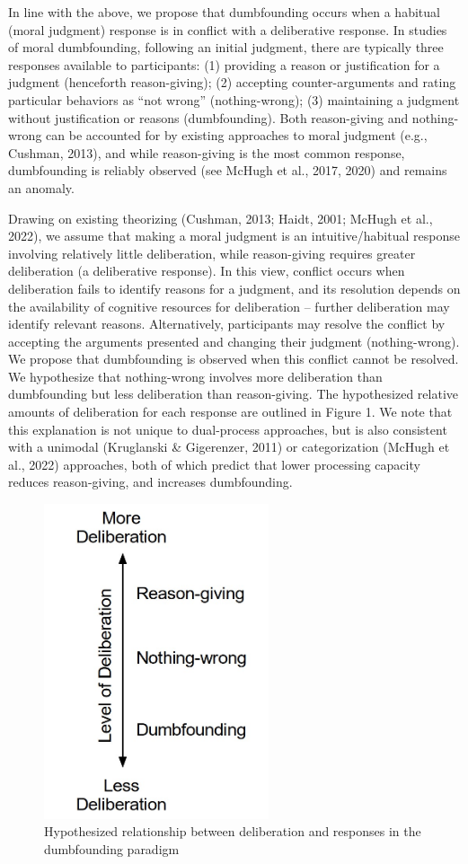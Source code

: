 \documentclass[
  man,floatsintext]{apa6}
\begin{document}
In line with the above, we propose that dumbfounding occurs when a habitual (moral judgment) response is in conflict with a deliberative response. In studies of moral dumbfounding, following an initial judgment, there are typically three responses available to participants: (1) providing a reason or justification for a judgment (henceforth reason-giving); (2) accepting counter-arguments and rating particular behaviors as ``not wrong'' (nothing-wrong); (3) maintaining a judgment without justification or reasons (dumbfounding). Both reason-giving and nothing-wrong can be accounted for by existing approaches to moral judgment (e.g., Cushman, 2013), and while reason-giving is the most common response, dumbfounding is reliably observed (see McHugh et al., 2017, 2020) and remains an anomaly.

Drawing on existing theorizing (Cushman, 2013; Haidt, 2001; McHugh et al., 2022), we assume that making a moral judgment is an intuitive/habitual response involving relatively little deliberation, while reason-giving requires greater deliberation (a deliberative response). In this view, conflict occurs when deliberation fails to identify reasons for a judgment, and its resolution depends on the availability of cognitive resources for deliberation -- further deliberation may identify relevant reasons. Alternatively, participants may resolve the conflict by accepting the arguments presented and changing their judgment (nothing-wrong). We propose that dumbfounding is observed when this conflict cannot be resolved. We hypothesize that nothing-wrong involves more deliberation than dumbfounding but less deliberation than reason-giving. The hypothesized relative amounts of deliberation for each response are outlined in Figure 1. We note that this explanation is not unique to dual-process approaches, but is also consistent with a unimodal (Kruglanski \& Gigerenzer, 2011) or categorization (McHugh et al., 2022) approaches, both of which predict that lower processing capacity reduces reason-giving, and increases dumbfounding.

\begin{figure}
\centering
\includegraphics[width=2.60417in,height=\textheight]{../resources/images/responses_figure4.jpg}
\caption{Hypothesized relationship between deliberation and responses in the dumbfounding paradigm}
\end{figure}
\end{document}

